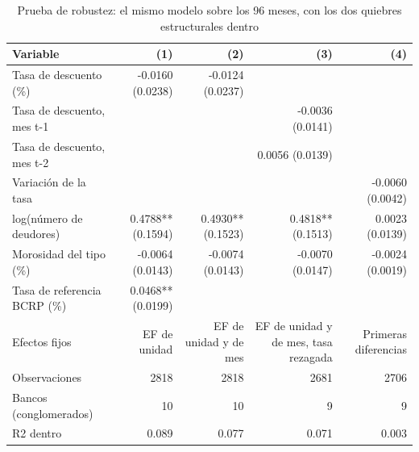 \begin{table}[htbp]
\caption{Prueba de robustez: el mismo modelo sobre los 96 meses, con los dos quiebres estructurales dentro}
\label{tab:robustez}
\begin{tabular}{lrrrr}
\toprule
Variable & (1) & (2) & (3) & (4) \\
\midrule
Tasa de descuento (\%) & -0.0160 (0.0238) & -0.0124 (0.0237) &  &  \\
Tasa de descuento, mes t-1 &  &  & -0.0036 (0.0141) &  \\
Tasa de descuento, mes t-2 &  &  & 0.0056 (0.0139) &  \\
Variación de la tasa &  &  &  & -0.0060 (0.0042) \\
log(número de deudores) & 0.4788** (0.1594) & 0.4930** (0.1523) & 0.4818** (0.1513) & 0.0023 (0.0139) \\
Morosidad del tipo (\%) & -0.0064 (0.0143) & -0.0074 (0.0143) & -0.0070 (0.0147) & -0.0024 (0.0019) \\
Tasa de referencia BCRP (\%) & 0.0468** (0.0199) &  &  &  \\
Efectos fijos & EF de unidad & EF de unidad y de mes & EF de unidad y de mes, tasa rezagada & Primeras diferencias \\
Observaciones & 2818 & 2818 & 2681 & 2706 \\
Bancos (conglomerados) & 10 & 10 & 9 & 9 \\
R2 dentro & 0.089 & 0.077 & 0.071 & 0.003 \\
\bottomrule
\end{tabular}
\end{table}
